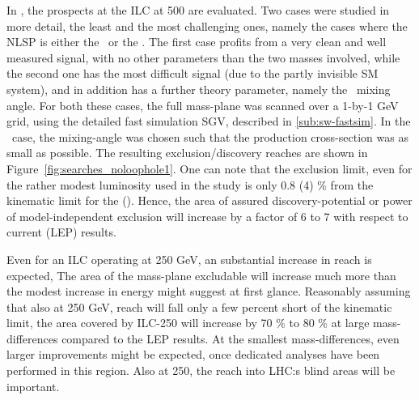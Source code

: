 In \cite{Berggren:2013vna},
the prospects at the ILC at 500 are evaluated.
Two cases were studied in more detail, 
the least and the most challenging ones, 
namely the cases where the NLSP is either the \smur~or the \stone.
The first case profits from a very clean and well measured
signal,
with no other parameters than the two masses involved,
while the second one has the most difficult signal 
(due to the partly invisible SM system),
and in addition has a further theory parameter,
namely the \stau~mixing angle.
For both these cases,
the full mass-plane was scanned over a 1-by-1 GeV grid,
using the detailed fast simulation SGV, described in  \ref{sub:sw-fastsim}.
In the \stone~case, the mixing-angle was chosen such that the
production cross-section was as small as possible.
The resulting exclusion/discovery reaches are shown in
Figure~\ref{fig:searches_noloophole1}.
One can note that the exclusion limit,
even for the rather modest luminosity used in the study
is only 0.8 (4) \% from the kinematic limit for the \smur (\stone).
Hence, the area of assured discovery-potential or power of
model-independent exclusion
will increase by a factor of 6 to 7 with respect to current (LEP) results.

Even for an ILC operating at 250 GeV, 
an substantial increase in reach is expected,
The area of the mass-plane excludable will increase
much more than the modest increase in energy might suggest at first glance.
Reasonably assuming that also at 250 GeV, 
reach will fall only a few percent short of the kinematic limit,
the area covered by ILC-250 will increase
by 70 \% to 80 \% at large mass-differences compared to the LEP results.
At the smallest mass-differences,
even larger improvements might be expected,
once dedicated analyses have been performed in this region.
Also at 250,
the reach into LHC:s blind areas will be important.
